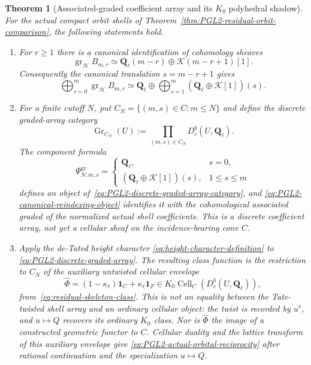 \documentclass[11pt]{article}
\newtheorem{theorem}{Theorem}[section]
\theoremstyle{definition}
\theoremstyle{remark}
\newcommand{\Qell}{\mathbf Q_\ell}
\newcommand{\kappaell}{\kappa_{\ell}}
\newcommand{\one}{\mathbf 1}
\newcommand{\cK}{\mathcal K}
\newcommand{\Cell}{\operatorname{Cell}}
\begin{document}
\begin{theorem}[Associated-graded coefficient array and its $K_0$ polyhedral shadow]
\label{thm:PGL2-narrow-skeletonization}
For the actual compact orbit shells of
Theorem~\ref{thm:PGL2-residual-orbit-comparison}, the following statements
hold.
\begin{enumerate}[label=\textup{(\roman*)}]
\item For $r\ge1$ there is a canonical identification of cohomology sheaves
  \begin{equation}
   \operatorname{gr}_{\mathcal H}B_{m,r}
   \simeq
   \Qell(m-r)\oplus\cK(m-r+1)[1].
   \label{eq:PGL2-shell-cohomology-graded}
  \end{equation}
  Consequently the canonical translation $s=m-r+1$ gives
  \begin{equation}
   \bigoplus_{r=0}^m\operatorname{gr}_{\mathcal H}B_{m,r}
   \simeq
   \Qell\oplus
   \bigoplus_{s=1}^m(\Qell\oplus\cK[1])(s).
   \label{eq:PGL2-canonical-reindexing-object}
  \end{equation}
\item For a finite cutoff $N$, put
  $C_N=\{(m,s)\in C:m\le N\}$ and define the discrete graded-array category
  \begin{equation}
   \operatorname{Gr}_{C_N}(U)
   :=\prod_{(m,s)\in C_N}D_c^b(U,\Qell).
   \label{eq:PGL2-discrete-graded-array-category}
  \end{equation}
  The component formula
  \begin{equation}
   \Psi^{\operatorname{gr}}_{N;m,s}
   =
   \begin{cases}
    \Qell,&s=0,\\
    (\Qell\oplus\cK[1])(s),&1\le s\le m
   \end{cases}
   \label{eq:PGL2-discrete-graded-array}
  \end{equation}
  defines an object of~\eqref{eq:PGL2-discrete-graded-array-category}, and
  \eqref{eq:PGL2-canonical-reindexing-object} identifies it with the
  cohomological associated graded of the normalized actual shell coefficients.
  This is a discrete coefficient array, not yet a cellular sheaf on the
  incidence-bearing cone $C$.
\item Apply the de-Tated height character
  \eqref{eq:height-character-definition} to
  \eqref{eq:PGL2-discrete-graded-array}.  The resulting class function is the
  restriction to $C_N$ of the auxiliary untwisted cellular envelope
  \begin{equation}
   \widehat\Phi=(1-\kappaell)\one_C+\kappaell\one_F
   \in K_0\Cell_C(D_c^b(U,\Qell)),
   \label{eq:PGL2-associated-graded-K0-envelope}
  \end{equation}
  from~\eqref{eq:residual-skeleton-class}.  This is not an equality between
  the Tate-twisted shell array and an ordinary cellular object: the twist is
  recorded by $u^s$, and $u\mapsto Q$ recovers its ordinary $K_0$ class.
  Nor is $\widehat\Phi$ the image of a constructed geometric functor to $C$.
  Cellular duality and the lattice transform of this auxiliary envelope give
  \eqref{eq:PGL2-actual-orbital-reciprocity} after rational continuation and
  the specialization $u\mapsto Q$.
\end{enumerate}
\end{theorem}
\end{document}
